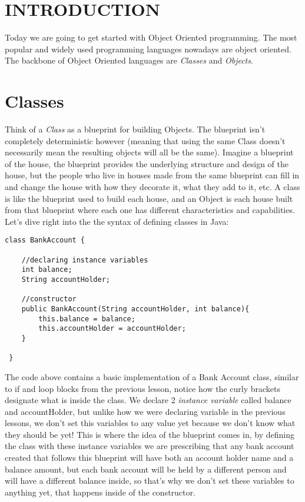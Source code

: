 \documentclass[14pt]{extreport}%
\begin{document}
\section*{INTRODUCTION}     
Today we are going to get started with Object Oriented programming. The most popular and widely used programming languages nowadays are object oriented. The backbone of Object Oriented languages are \textit{Classes} and \textit{Objects}. 

\section*{Classes}
Think of a \textit{Class} as a blueprint for building Objects. The blueprint isn't completely deterministic however (meaning that using the same Class doesn't necessarily mean the resulting objects will all be the same). Imagine a blueprint of the house, the blueprint provides the underlying structure and design of the house, but the people who live in houses made from the same blueprint can fill in and change the house with how they decorate it, what they add to it, etc. A class is like the blueprint used to build each house, and an Object is each house built from that blueprint where each one has different characteristics and capabilities. Let's dive right into the the syntax of defining classes in Java:

\begin{lstlisting}
class BankAccount {
     
    //declaring instance variables 
    int balance;
    String accountHolder;
    
    //constructor 
    public BankAccount(String accountHolder, int balance){
        this.balance = balance;
        this.accountHolder = accountHolder;
    }

 }
\end{lstlisting}{}
The code above contains a basic implementation of a Bank Account class, similar to if and loop blocks from the previous lesson, notice how the curly brackets designate what is inside the class. We declare 2 \textit{instance variable} called balance and accountHolder, but unlike how we were declaring variable in the previous lessons, we don't set this variables to any value yet because we don't know what they should be yet! This is where the idea of the blueprint comes in, by defining the class with these instance variables we are prescribing that any bank account created that follows this blueprint will have both an account holder name and a balance amount, but each bank account will be held by a different person and will have a different balance inside, so that's why we don't set these variables to anything yet, that happens inside of the constructor.
\end{document}
